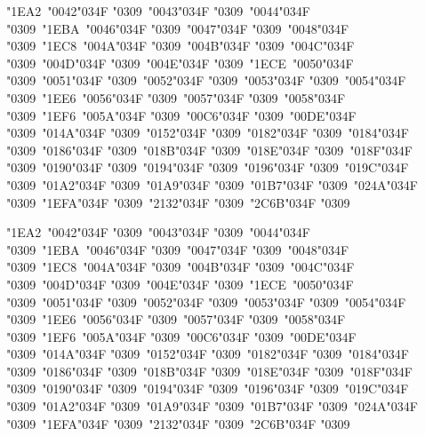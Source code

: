 \documentclass[10pt]{article}
\newcommand{\cgj}{\char"034F }
\begin{document}
\par\noindent{}\parbox[t]{\dimexpr\linewidth-2.4cm}{\PropR\fontsize{18}{30}\selectfont\raggedright {\color{pre}\char"1EA2}\ \char"0042\cgj\char"0309\ \char"0043\cgj\char"0309\ \char"0044\cgj\char"0309\ {\color{pre}\char"1EBA}\ \char"0046\cgj\char"0309\ \char"0047\cgj\char"0309\ \char"0048\cgj\char"0309\ {\color{pre}\char"1EC8}\ \char"004A\cgj\char"0309\ \char"004B\cgj\char"0309\ \char"004C\cgj\char"0309\ \char"004D\cgj\char"0309\ \char"004E\cgj\char"0309\ {\color{pre}\char"1ECE}\ \char"0050\cgj\char"0309\ \char"0051\cgj\char"0309\ \char"0052\cgj\char"0309\ \char"0053\cgj\char"0309\ \char"0054\cgj\char"0309\ {\color{pre}\char"1EE6}\ \char"0056\cgj\char"0309\ \char"0057\cgj\char"0309\ \char"0058\cgj\char"0309\ {\color{pre}\char"1EF6}\ \char"005A\cgj\char"0309\ \char"00C6\cgj\char"0309\ \char"00DE\cgj\char"0309\ \char"014A\cgj\char"0309\ \char"0152\cgj\char"0309\ \char"0182\cgj\char"0309\ \char"0184\cgj\char"0309\ \char"0186\cgj\char"0309\ \char"018B\cgj\char"0309\ \char"018E\cgj\char"0309\ \char"018F\cgj\char"0309\ \char"0190\cgj\char"0309\ \char"0194\cgj\char"0309\ \char"0196\cgj\char"0309\ \char"019C\cgj\char"0309\ \char"01A2\cgj\char"0309\ \char"01A9\cgj\char"0309\ \char"01B7\cgj\char"0309\ \char"024A\cgj\char"0309\ \char"1EFA\cgj\char"0309\ \char"2132\cgj\char"0309\ \char"2C6B\cgj\char"0309}\par
\par\noindent{}\parbox[t]{\dimexpr\linewidth-2.4cm}{\PropI\fontsize{18}{30}\selectfont\raggedright {\color{pre}\char"1EA2}\ \char"0042\cgj\char"0309\ \char"0043\cgj\char"0309\ \char"0044\cgj\char"0309\ {\color{pre}\char"1EBA}\ \char"0046\cgj\char"0309\ \char"0047\cgj\char"0309\ \char"0048\cgj\char"0309\ {\color{pre}\char"1EC8}\ \char"004A\cgj\char"0309\ \char"004B\cgj\char"0309\ \char"004C\cgj\char"0309\ \char"004D\cgj\char"0309\ \char"004E\cgj\char"0309\ {\color{pre}\char"1ECE}\ \char"0050\cgj\char"0309\ \char"0051\cgj\char"0309\ \char"0052\cgj\char"0309\ \char"0053\cgj\char"0309\ \char"0054\cgj\char"0309\ {\color{pre}\char"1EE6}\ \char"0056\cgj\char"0309\ \char"0057\cgj\char"0309\ \char"0058\cgj\char"0309\ {\color{pre}\char"1EF6}\ \char"005A\cgj\char"0309\ \char"00C6\cgj\char"0309\ \char"00DE\cgj\char"0309\ \char"014A\cgj\char"0309\ \char"0152\cgj\char"0309\ \char"0182\cgj\char"0309\ \char"0184\cgj\char"0309\ \char"0186\cgj\char"0309\ \char"018B\cgj\char"0309\ \char"018E\cgj\char"0309\ \char"018F\cgj\char"0309\ \char"0190\cgj\char"0309\ \char"0194\cgj\char"0309\ \char"0196\cgj\char"0309\ \char"019C\cgj\char"0309\ \char"01A2\cgj\char"0309\ \char"01A9\cgj\char"0309\ \char"01B7\cgj\char"0309\ \char"024A\cgj\char"0309\ \char"1EFA\cgj\char"0309\ \char"2132\cgj\char"0309\ \char"2C6B\cgj\char"0309}\par
\end{document}

